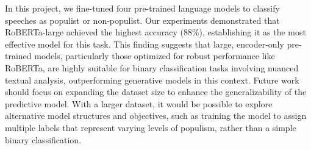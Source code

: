 \documentclass[11pt,twocolumn,letterpaper]{article}
\begin{document}
In this project, we fine-tuned four pre-trained language models to classify speeches as populist or non-populist. Our experiments demonstrated that RoBERTa-large achieved the highest accuracy (88\%), establishing it as the most effective model for this task. This finding suggests that large, encoder-only pre-trained models, particularly those optimized for robust performance like RoBERTa, are highly suitable for binary classification tasks involving nuanced textual analysis, outperforming generative models in this context. Future work should focus on expanding the dataset size to enhance the generalizability of the predictive model. With a larger dataset, it would be possible to explore alternative model structures and objectives, such as training the model to assign multiple labels that represent varying levels of populism, rather than a simple binary classification.

\break

{\small


}
\end{document}
